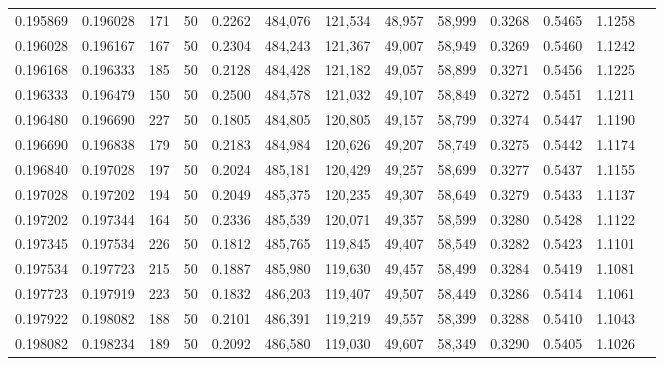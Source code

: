 \begin{tabular}{rrrrrrrrrrrrr}
0.195869 & 0.196028 &   171 &  50 &                                     0.2262 & 484,076 & 121,534 &  48,957 &  58,999 & 0.3268 & 0.5465 & 1.1258 \\
0.196028 & 0.196167 &   167 &  50 &                                     0.2304 & 484,243 & 121,367 &  49,007 &  58,949 & 0.3269 & 0.5460 & 1.1242 \\
0.196168 & 0.196333 &   185 &  50 &                                     0.2128 & 484,428 & 121,182 &  49,057 &  58,899 & 0.3271 & 0.5456 & 1.1225 \\
0.196333 & 0.196479 &   150 &  50 &                                     0.2500 & 484,578 & 121,032 &  49,107 &  58,849 & 0.3272 & 0.5451 & 1.1211 \\
0.196480 & 0.196690 &   227 &  50 &                                     0.1805 & 484,805 & 120,805 &  49,157 &  58,799 & 0.3274 & 0.5447 & 1.1190 \\
0.196690 & 0.196838 &   179 &  50 &                                     0.2183 & 484,984 & 120,626 &  49,207 &  58,749 & 0.3275 & 0.5442 & 1.1174 \\
0.196840 & 0.197028 &   197 &  50 &                                     0.2024 & 485,181 & 120,429 &  49,257 &  58,699 & 0.3277 & 0.5437 & 1.1155 \\
0.197028 & 0.197202 &   194 &  50 &                                     0.2049 & 485,375 & 120,235 &  49,307 &  58,649 & 0.3279 & 0.5433 & 1.1137 \\
0.197202 & 0.197344 &   164 &  50 &                                     0.2336 & 485,539 & 120,071 &  49,357 &  58,599 & 0.3280 & 0.5428 & 1.1122 \\
0.197345 & 0.197534 &   226 &  50 &                                     0.1812 & 485,765 & 119,845 &  49,407 &  58,549 & 0.3282 & 0.5423 & 1.1101 \\
0.197534 & 0.197723 &   215 &  50 &                                     0.1887 & 485,980 & 119,630 &  49,457 &  58,499 & 0.3284 & 0.5419 & 1.1081 \\
0.197723 & 0.197919 &   223 &  50 &                                     0.1832 & 486,203 & 119,407 &  49,507 &  58,449 & 0.3286 & 0.5414 & 1.1061 \\
0.197922 & 0.198082 &   188 &  50 &                                     0.2101 & 486,391 & 119,219 &  49,557 &  58,399 & 0.3288 & 0.5410 & 1.1043 \\
0.198082 & 0.198234 &   189 &  50 &                                     0.2092 & 486,580 & 119,030 &  49,607 &  58,349 & 0.3290 & 0.5405 & 1.1026 \\

\end{tabular}
